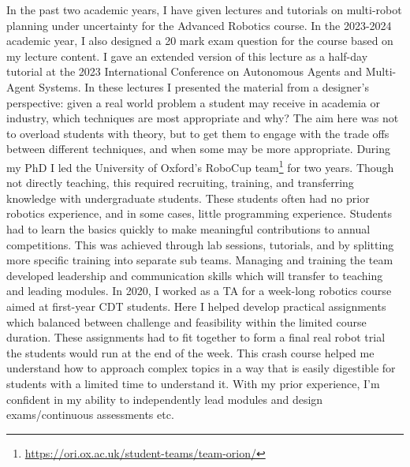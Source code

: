 \documentclass[12pt]{article}
\begin{document}

In the past two academic years, I have given lectures and tutorials on multi-robot planning under uncertainty for the Advanced Robotics course.
%
In the 2023-2024 academic year, I also designed a 20 mark exam question for the course based on my lecture content.
%
I gave an extended version of this lecture as a half-day tutorial at the 2023 International Conference on Autonomous Agents and Multi-Agent Systems.
%
In these lectures I presented the material from a designer's perspective: given a real world problem a student may receive in academia or industry, which techniques are most appropriate and why?
%
The aim here was not to overload students with theory, but to get them to engage with the trade offs between different techniques, and when some may be more appropriate.
%
During my PhD I led the University of Oxford's RoboCup team\footnote{\url{https://ori.ox.ac.uk/student-teams/team-orion/}} for two years.
%
Though not directly teaching, this required recruiting, training, and transferring knowledge with undergraduate students.
%
These students often had no prior robotics experience, and in some cases, little programming experience.
%
Students had to learn the basics quickly to make meaningful contributions to annual competitions.
%
This was achieved through lab sessions, tutorials, and by splitting more specific training into separate sub teams.
%
Managing and training the team developed leadership and communication skills which will transfer to teaching and leading modules.
%
In 2020, I worked as a TA for a week-long robotics course aimed at first-year CDT students.
%
Here I helped develop practical assignments which balanced between challenge and feasibility within the limited course duration.
%
These assignments had to fit together to form a final real robot trial the students would run at the end of the week.
%
This crash course helped me understand how to approach complex topics in a way that is easily digestible for students with a limited time to understand it.
%
With my prior experience, I'm confident in my ability to independently lead modules and design exams/continuous assessments etc.
\end{document}
